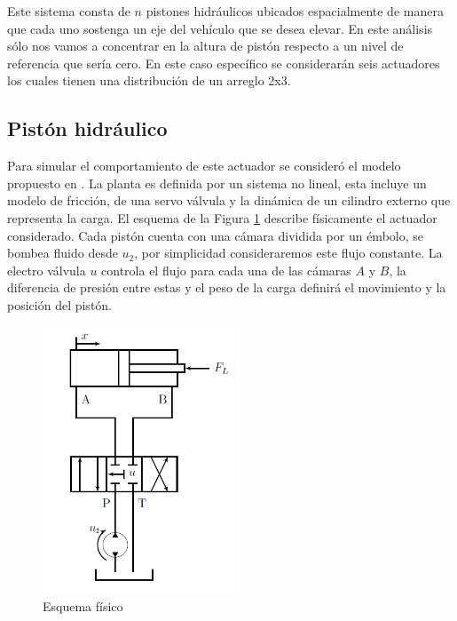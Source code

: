 

Este sistema consta de $n$ pistones hidráulicos ubicados espacialmente de manera que cada uno sostenga un eje del vehículo que se desea elevar. En este análisis sólo nos vamos a concentrar en la altura de pistón respecto a un nivel de referencia que sería cero. En este caso específico se considerarán seis actuadores  los cuales tienen una distribución de un arreglo 2x3.


\subsection{Pistón hidráulico}
Para simular el comportamiento de este actuador se consideró el modelo propuesto en \cite{Electro-hydraulic_actuator}. La planta es definida por un sistema no lineal, esta incluye un modelo de fricción, de una servo válvula y la dinámica de un cilindro externo que representa la carga. El esquema de la Figura \ref{fig_esquemapiston} describe físicamente el actuador considerado. Cada pistón cuenta con una cámara dividida por un émbolo, se bombea fluido desde $u_2$, por simplicidad consideraremos este flujo constante. La electro válvula $u$ controla el flujo para cada una de las cámaras $A$ y $B$, la diferencia de presión entre estas y el peso de la carga definirá el movimiento y la posición del pistón. 

\begin{figure}[!t]
	\centering
	\includegraphics[width=2.3in]{imagenes/esquemapiston.jpg}
	\caption{Esquema físico}
	\label{fig_esquemapiston}
\end{figure}

